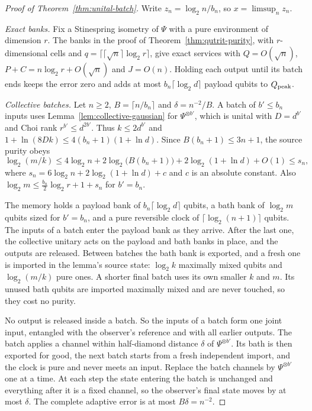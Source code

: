\begin{proof}[Proof of Theorem~\ref{thm:unital-batch}]
Write $z_n=\log_2n/b_n$, so $x=\limsup_nz_n$.

\emph{Exact banks.} Fix a Stinespring isometry of $\Psi$ with a pure
environment of dimension $r$. The banks in the proof of
Theorem~\ref{thm:qutrit-purity}, with $r$-dimensional cells and
$q=\lceil\lceil\sqrt n\rceil\log_2r\rceil$, give exact services with
$Q=O(\sqrt n)$, $P+C=n\log_2r+O(\sqrt n)$ and $J=O(n)$. Holding each
output until its batch ends keeps the error zero and adds at most
$b_n\lceil\log_2d\rceil$ payload qubits to $Q_{\rm peak}$.

\emph{Collective batches.} Let $n\geq2$, $B=\lceil n/b_n\rceil$ and
$\delta=n^{-2}/B$. A batch of $b'\leq b_n$ inputs uses
Lemma~\ref{lem:collective-gaussian} for $\Psi^{\otimes b'}$, which is
unital with $D=d^{b'}$ and Choi rank $r^{b'}\leq d^{2b'}$. Thus
$k\leq2d^{b'}$ and $1+\ln(8Dk)\leq4(b_n+1)(1+\ln d)$. Since
$B(b_n+1)\leq3n+1$, the source purity obeys
\[
 \log_2(m/k)\leq4\log_2n+2\log_2\bigl(B(b_n+1)\bigr)+2\log_2(1+\ln d)+O(1)
 \leq s_n,
\]
where $s_n=6\log_2n+2\log_2(1+\ln d)+c$ and $c$ is an absolute
constant. Also $\log_2m\leq\frac{b_n}2\log_2r+1+s_n$ for $b'=b_n$.

The memory holds a payload bank of $b_n\lceil\log_2d\rceil$ qubits, a
bath bank of $\log_2m$ qubits sized for $b'=b_n$, and a pure reversible
clock of $\lceil\log_2(n+1)\rceil$ qubits. The inputs of a batch enter
the payload bank as they arrive. After the last one, the collective
unitary acts on the payload and bath banks in place, and the outputs are
released. Between batches the bath bank is exported, and a fresh one is
imported in the lemma's source state: $\log_2k$ maximally mixed qubits
and $\log_2(m/k)$ pure ones. A shorter final batch uses its own smaller
$k$ and $m$. Its unused bath qubits are imported maximally mixed and are
never touched, so they cost no purity.

No output is released inside a batch. So the inputs of a batch form one
joint input, entangled with the observer's reference and with all
earlier outputs. The batch applies a channel within half-diamond
distance $\delta$ of $\Psi^{\otimes b'}$. Its bath is then exported for
good, the next batch starts from a fresh independent import, and the
clock is pure and never meets an input. Replace the batch channels by
$\Psi^{\otimes b'}$ one at a time. At each step the state entering the
batch is unchanged and everything after it is a fixed channel, so the
observer's final state moves by at most $\delta$. The complete adaptive
error is at most $B\delta=n^{-2}$.


\end{proof}
